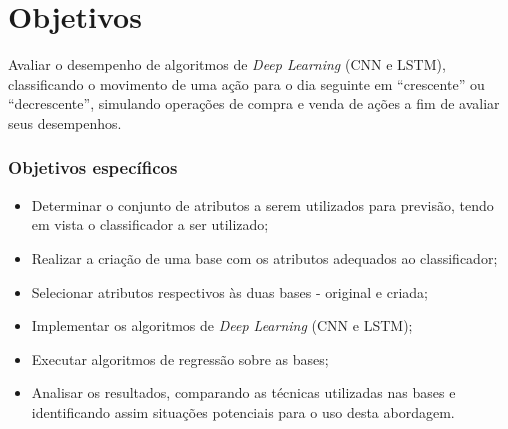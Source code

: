 \chapter{Objetivos}

\par
Avaliar o desempenho de algoritmos de \textit{Deep Learning} (CNN e LSTM), classificando o movimento de uma ação para o dia seguinte em “crescente” ou “decrescente”, simulando operações de compra e venda de ações a fim de avaliar seus desempenhos.

\subsection{Objetivos específicos}
\begin{itemize}
\item Determinar o conjunto de atributos a serem utilizados para previsão, tendo em vista o classificador a ser utilizado;
\item Realizar a criação de uma base com os atributos adequados ao classificador;
\item Selecionar atributos respectivos às duas bases - original e criada;
\item Implementar os algoritmos de \textit{Deep Learning} (CNN e LSTM);
\item Executar algoritmos de regressão sobre as bases;
\item Analisar os resultados, comparando as técnicas utilizadas nas bases e identificando assim situações potenciais para o uso desta abordagem.

\end{itemize}